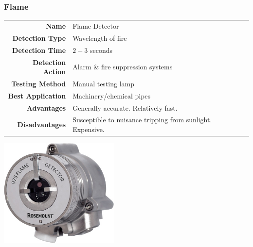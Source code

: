 \documentclass[11pt,a4paper]{article}
\begin{document}
\subsubsection{Flame}
\begin{tabular}{|r|l|}
  \hline
\textbf{Name} & Flame Detector \\
\textbf{Detection Type} & Wavelength of fire \\
\textbf{Detection Time} & $2-3$ seconds \\
\textbf{Detection Action} & Alarm \& fire suppression systems \\
\textbf{Testing Method} & Manual testing lamp \\
\textbf{Best Application} & Machinery/chemical pipes \\
\textbf{Advantages} & Generally accurate. Relatively fast. \\
\textbf{Disadvantages} & Susceptible to nuisance tripping from sunlight. Expensive. \\
\hline
\end{tabular}
\begin{center}
\includegraphics[width=6cm]{flamedetector}
\end{center}
\end{document}
